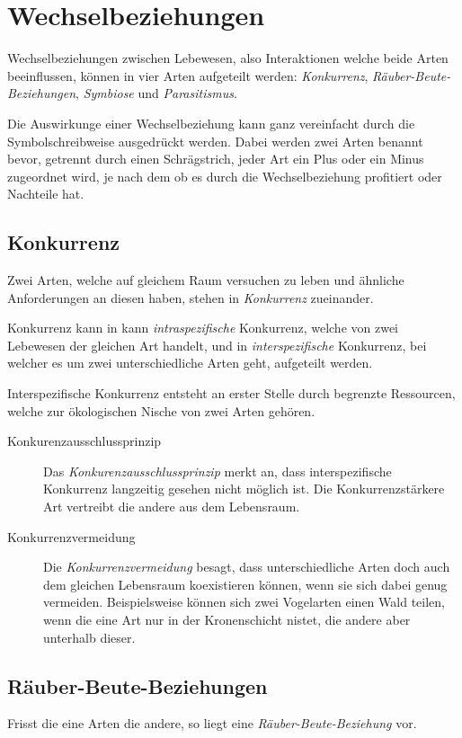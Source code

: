 \documentclass{article}
\begin{document}
\section{Wechselbeziehungen} 
Wechselbeziehungen zwischen Lebewesen, also Interaktionen welche beide Arten beeinflussen, können in vier Arten aufgeteilt werden: \emph{Konkurrenz}, \emph{Räuber-Beute-Beziehungen}, \emph{Symbiose} und \emph{Parasitismus}.
 
Die Auswirkunge einer Wechselbeziehung kann ganz vereinfacht durch die Symbolschreibweise ausgedrückt werden. Dabei werden zwei Arten benannt bevor, getrennt durch einen Schrägstrich, jeder Art ein Plus oder ein Minus zugeordnet wird, je nach dem ob es durch die Wechselbeziehung profitiert oder Nachteile hat. 
  
\subsection{Konkurrenz}
Zwei Arten, welche auf gleichem Raum versuchen zu leben und ähnliche Anforderungen an diesen haben, stehen in \emph{Konkurrenz} zueinander.  
 
Konkurrenz kann in kann \emph{intraspezifische} Konkurrenz, welche von zwei Lebewesen der gleichen Art handelt, und in \emph{interspezifische} Konkurrenz, bei welcher es um zwei unterschiedliche Arten geht, aufgeteilt werden.  
 
Interspezifische Konkurrenz entsteht an erster Stelle durch begrenzte Ressourcen, welche zur ökologischen Nische von zwei Arten gehören. 
\begin{description} 
 \item[Konkurenzausschlussprinzip] Das \emph{Konkurenzausschlussprinzip} merkt an, dass interspezifische Konkurrenz langzeitig gesehen nicht möglich ist. Die Konkurrenzstärkere Art vertreibt die andere aus dem Lebensraum.
 
 \item[Konkurrenzvermeidung] Die \emph{Konkurrenzvermeidung} besagt, dass unterschiedliche Arten doch auch dem gleichen Lebensraum koexistieren können, wenn sie sich dabei genug vermeiden. Beispielsweise können sich zwei Vogelarten einen Wald teilen, wenn die eine Art nur in der Kronenschicht nistet, die andere aber unterhalb dieser. 
\end{description} 
 
\subsection{Räuber-Beute-Beziehungen} 
Frisst die eine Arten die andere, so liegt eine \emph{Räuber-Beute-Beziehung} vor.
 
\end{document}
